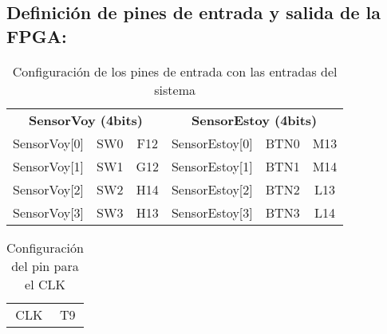 ﻿\subsection{Definición de pines de entrada y salida de la FPGA:}
	\begin{table}[H]
    \centering
		\begin{tabular}{|c|c|c|c|c|c|}
			\hline
			\rowcolor[rgb]{0.21,0.69,0.87}\multicolumn{6}{|c|}{  \textbf{ {Configuración Pines de entrada}}} \\
			\hline \hline
			\multicolumn{3}{|c|}{  \textbf{ {SensorVoy (4bits)}}} & \multicolumn{3}{|c|}{\textbf{SensorEstoy (4bits)}} \\
			\hline
			SensorVoy[0] & SW0 & F12 & SensorEstoy[0] & BTN0 & M13 \\
			\hline
			SensorVoy[1] & SW1 & G12 & SensorEstoy[1] & BTN1 & M14 \\
			\hline
			SensorVoy[2] & SW2 & H14 & SensorEstoy[2] & BTN2 & L13 \\
			\hline
			SensorVoy[3] & SW3 & H13 & SensorEstoy[3] & BTN3 & L14 \\
			\hline
		\end{tabular}
		\caption{ Configuración de los pines de entrada con las entradas del sistema }
		\label{tab:pinEntradas}
	\end{table}

	\begin{table}[H]
    \centering
		\begin{tabular}{|c|c|}
			\hline
			\rowcolor[rgb]{0.21,0.69,0.87}\multicolumn{2}{|c|}{  \textbf{ {Configuración pin CLK}}} \\
			\hline \hline
			CLK & T9 \\ 
			\hline
		\end{tabular}
		\caption{ Configuración del pin para el CLK }
		\label{tab:pinCLK}
	\end{table}


